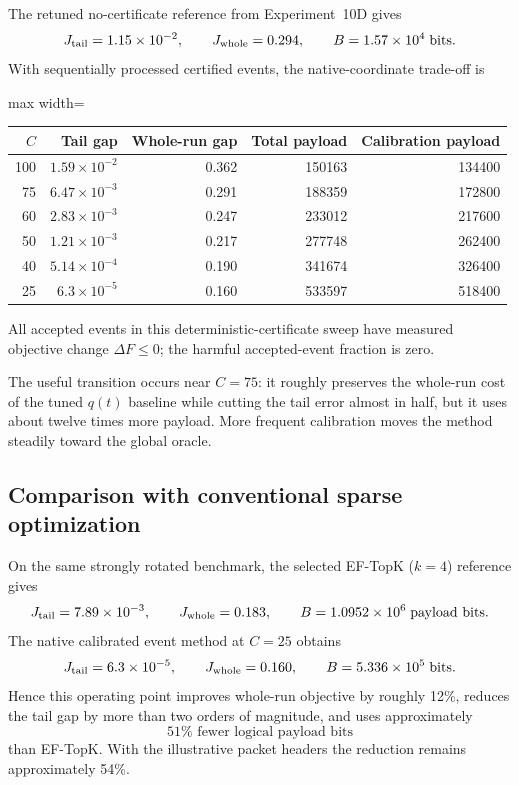 The retuned no-certificate reference from Experiment~10D gives
\begin{equation}
  J_{\rm tail}=1.15\times10^{-2},
  \qquad
  J_{\rm whole}=0.294,
  \qquad
  B=1.57\times10^4\;\text{bits}.
\end{equation}
With sequentially processed certified events, the native-coordinate trade-off is
\begin{center}
\begin{adjustbox}{max width=\textwidth}
\begin{tabular}{rrrrr}
\toprule
$C$ & Tail gap & Whole-run gap & Total payload & Calibration payload \\
\midrule
100 & $1.59\times10^{-2}$ & 0.362 & 150163 & 134400 \\
75  & $6.47\times10^{-3}$ & 0.291 & 188359 & 172800 \\
60  & $2.83\times10^{-3}$ & 0.247 & 233012 & 217600 \\
50  & $1.21\times10^{-3}$ & 0.217 & 277748 & 262400 \\
40  & $5.14\times10^{-4}$ & 0.190 & 341674 & 326400 \\
25  & $6.3\times10^{-5}$ & 0.160 & 533597 & 518400 \\
\bottomrule
\end{tabular}
\end{adjustbox}
\end{center}
All accepted events in this deterministic-certificate sweep have measured objective change $\Delta F\leq0$; the harmful accepted-event fraction is zero.

The useful transition occurs near $C=75$: it roughly preserves the whole-run cost of the tuned $q(t)$ baseline while cutting the tail error almost in half, but it uses about twelve times more payload. More frequent calibration moves the method steadily toward the global oracle.

\subsection{Comparison with conventional sparse optimization}

On the same strongly rotated benchmark, the selected EF-TopK ($k=4$) reference gives
\begin{equation}
  J_{\rm tail}=7.89\times10^{-3},
  \qquad
  J_{\rm whole}=0.183,
  \qquad
  B=1.0952\times10^6\;\text{payload bits}.
\end{equation}
The native calibrated event method at $C=25$ obtains
\begin{equation}
  J_{\rm tail}=6.3\times10^{-5},
  \qquad
  J_{\rm whole}=0.160,
  \qquad
  B=5.336\times10^5\;\text{bits}.
\end{equation}
Hence this operating point improves whole-run objective by roughly 12\%, reduces the tail gap by more than two orders of magnitude, and uses approximately
\begin{equation}
  \boxed{51\%\text{ fewer logical payload bits}}
\end{equation}
than EF-TopK. With the illustrative packet headers the reduction remains approximately 54\%.

